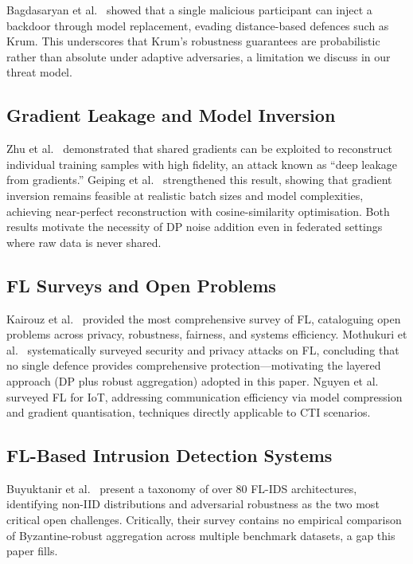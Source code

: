 \documentclass[conference]{IEEEtran}
\begin{document}
Bagdasaryan et al.~\cite{bagdasaryan2020} showed that a single
malicious participant can inject a backdoor through model replacement,
evading distance-based defences such as Krum.
This underscores that Krum's robustness guarantees are probabilistic
rather than absolute under adaptive adversaries, a limitation we
discuss in our threat model.

\subsection{Gradient Leakage and Model Inversion}

Zhu et al.~\cite{zhu2019} demonstrated that shared gradients can be
exploited to reconstruct individual training samples with high fidelity,
an attack known as ``deep leakage from gradients.''
Geiping et al.~\cite{geiping2020} strengthened this result, showing
that gradient inversion remains feasible at realistic batch sizes and
model complexities, achieving near-perfect reconstruction with
cosine-similarity optimisation.
Both results motivate the necessity of DP noise addition even in
federated settings where raw data is never shared.

\subsection{FL Surveys and Open Problems}

Kairouz et al.~\cite{kairouz2021} provided the most comprehensive
survey of FL, cataloguing open problems across privacy, robustness,
fairness, and systems efficiency.
Mothukuri et al.~\cite{mothukuri2021} systematically surveyed security
and privacy attacks on FL, concluding that no single defence provides
comprehensive protection---motivating the layered approach (DP plus
robust aggregation) adopted in this paper.
Nguyen et al.~\cite{nguyen2021} surveyed FL for IoT, addressing
communication efficiency via model compression and gradient
quantisation, techniques directly applicable to CTI scenarios.

\subsection{FL-Based Intrusion Detection Systems}

Buyuktanir et al.~\cite{buyuktanir2025} present a taxonomy of over
80 FL-IDS architectures, identifying non-IID distributions and
adversarial robustness as the two most critical open challenges.
Critically, their survey contains no empirical comparison of
Byzantine-robust aggregation across multiple benchmark datasets,
a gap this paper fills.
\end{document}
